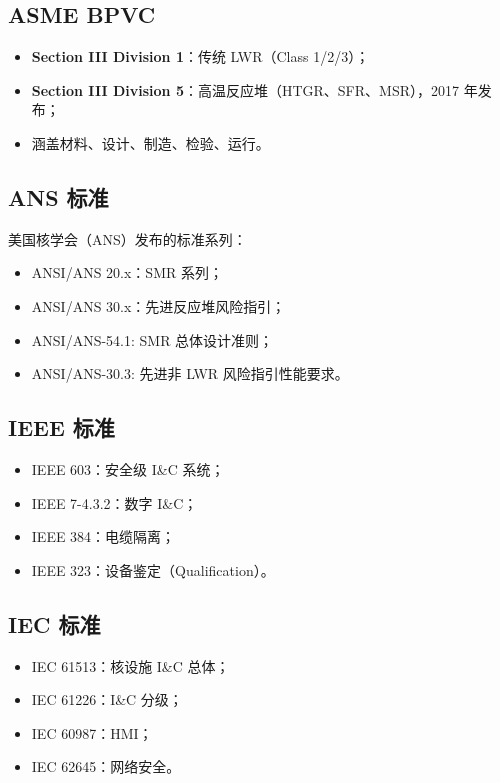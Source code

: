 \documentclass[
  UTF8,
  scheme=plain,
  fontsize=10pt,
  openany
]{ctexbook}
\begin{document}
\subsection{ASME BPVC}\label{asme-bpvc}

\begin{itemize}
\tightlist
\item
  \textbf{Section III Division 1}：传统 LWR（Class 1/2/3）；
\item
  \textbf{Section III Division 5}：高温反应堆（HTGR、SFR、MSR），2017
  年发布；
\item
  涵盖材料、设计、制造、检验、运行。
\end{itemize}

\subsection{ANS 标准}\label{ans-ux6807ux51c6}

美国核学会（ANS）发布的标准系列：

\begin{itemize}
\tightlist
\item
  ANSI/ANS 20.x：SMR 系列；
\item
  ANSI/ANS 30.x：先进反应堆风险指引；
\item
  ANSI/ANS-54.1: SMR 总体设计准则；
\item
  ANSI/ANS-30.3: 先进非 LWR 风险指引性能要求。
\end{itemize}

\subsection{IEEE 标准}\label{ieee-ux6807ux51c6}

\begin{itemize}
\tightlist
\item
  IEEE 603：安全级 I\&C 系统；
\item
  IEEE 7-4.3.2：数字 I\&C；
\item
  IEEE 384：电缆隔离；
\item
  IEEE 323：设备鉴定（Qualification）。
\end{itemize}

\subsection{IEC 标准}\label{iec-ux6807ux51c6}

\begin{itemize}
\tightlist
\item
  IEC 61513：核设施 I\&C 总体；
\item
  IEC 61226：I\&C 分级；
\item
  IEC 60987：HMI；
\item
  IEC 62645：网络安全。
\end{itemize}
\end{document}
